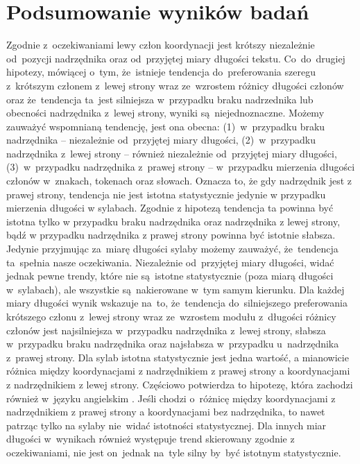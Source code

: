 \documentclass[licencjacka]{pracamgr_Kogni}
\begin{document}
    \section{Podsumowanie wyników badań}\label{sec:podsumowanie-wynikow-badan}
    Zgodnie z~oczekiwaniami lewy człon koordynacji jest krótszy niezależnie od~pozycji nadrzędnika oraz od~przyjętej miary długości tekstu.
    Co~do~drugiej hipotezy, mówiącej o~tym, że~istnieje tendencja do~preferowania szeregu z~krótszym członem z~lewej strony wraz ze~wzrostem różnicy długości członów oraz że~tendencja ta~jest silniejsza w~przypadku braku nadrzednika lub obecności nadrzędnika z~lewej strony, wyniki są~niejednoznaczne.
    Możemy zauważyć wspomnianą tendencję, jest ona obecna: (1)~w~przypadku braku nadrzędnika -- niezależnie od~przyjętej miary długości, (2)~w~przypadku nadrzędnika z~lewej strony -- również niezależnie od~przyjętej miary długości, (3)~w~przypadku nadrzędnika z~prawej strony -- w~przypadku mierzenia długości członów w~znakach, tokenach oraz słowach. 
    Oznacza to, że gdy nadrzędnik jest z prawej strony, tendencja nie jest istotna statystycznie jedynie w przypadku mierzenia długości w sylabach.
    Zgodnie z hipotezą tendencja ta powinna być istotna tylko w przypadku braku nadrzędnika oraz nadrzędnika z lewej strony, bądź w przypadku nadrzędnika z prawej strony powinna być istotnie słabsza.
    Jedynie przyjmując za~miarę długości sylaby możemy zauważyć, że~tendencja ta~spełnia nasze oczekiwania.
    Niezależnie od~przyjętej miary długości, widać jednak pewne trendy, które nie są~istotne statystycznie (poza miarą długości w~sylabach), ale wszystkie są~nakierowane w~tym samym kierunku.
    Dla każdej miary długości wynik wskazuje na~to, że~tendencja do~silniejszego preferowania krótszego członu z~lewej strony wraz ze~wzrostem modułu z~długości różnicy członów jest najsilniejsza w~przypadku nadrzędnika z~lewej strony, słabsza w~przypadku braku nadrzędnika oraz najsłabsza w~przypadku u~nadrzędnika z~prawej strony.
    Dla sylab istotna statystycznie jest jedna wartość, a mianowicie różnica między koordynacjami z nadrzędnikiem z prawej strony a koordynacjami z nadrzędnikiem z lewej strony.
    Częściowo potwierdza to hipotezę, która zachodzi również w~języku angielskim \citep{Przepiorkowski2023}.
    Jeśli chodzi o~różnicę między koordynacjami z nadrzędnikiem z prawej strony a koordynacjami bez nadrzędnika, to nawet patrząc tylko na sylaby nie~widać istotności statystycznej.
    Dla innych miar długości w~wynikach również występuje trend skierowany zgodnie z oczekiwaniami, nie jest on~jednak na~tyle silny by~być istotnym statystycznie.
    
\end{document}
